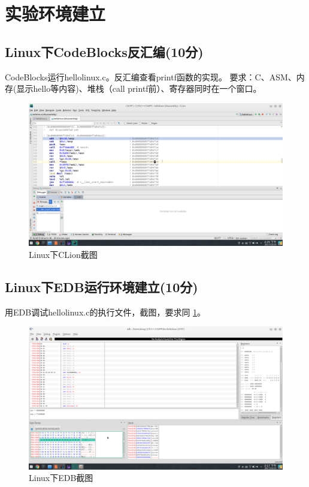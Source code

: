 \section{实验环境建立}
\subsection{Linux下CodeBlocks反汇编(10分)}
CodeBlocks运行hellolinux.c。反汇编查看printf函数的实现。
要求：C、ASM、内存(显示hello等内容)、堆栈（call printf前）、寄存器同时在一个窗口。

\begin{figure}[H]
	\centering
	\includegraphics[width=0.55\linewidth]{figures/Linux-Clion}
	\caption{Linux下CLion截图}
	\label{fig:linux-clion}
\end{figure}

\subsection{Linux下EDB运行环境建立(10分)}

用EDB调试hellolinux.c的执行文件，截图，要求同 \ref{fig:linux-clion}。

\begin{figure}[H]
	\centering
	\includegraphics[width=0.5\linewidth]{figures/Linux-EDB}
	\caption{Linux下EDB截图}
	\label{linux-edb}
\end{figure}

